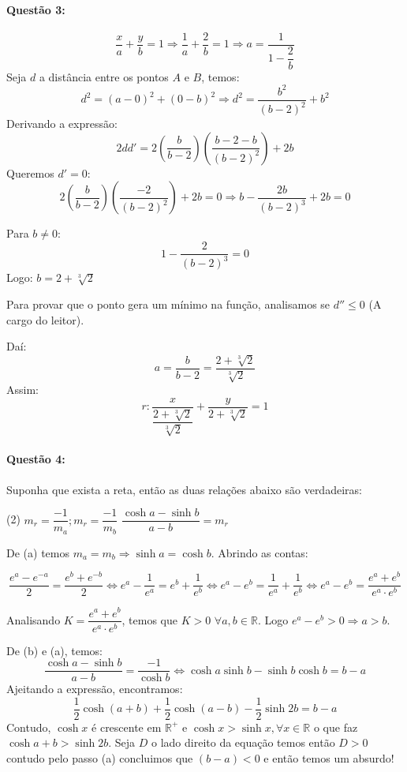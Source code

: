 \documentclass[12pt,a4paper]{article}
\begin{document}
\paragraph{Questão 3:}
$$\dfrac{x}{a} + \dfrac{y}{b} = 1 \Rightarrow \dfrac{1}{a} + \dfrac{2}{b} = 1 \Rightarrow a = \dfrac{1}{1 - \dfrac{2}{b}}$$
Seja $d$ a distância entre os pontos $A$ e $B$, temos:
$$d^2 = (a-0)^2 + (0-b)^2 \Rightarrow d^2 = \dfrac{b^2}{(b-2)^2} + b^2 $$
Derivando a expressão:
$$2dd' = 2 \left(\dfrac{b}{b-2}\right)\left(\dfrac{b-2-b}{(b-2)^2}\right)  + 2b$$ 
Queremos $d' = 0$:
$$2 \left(\dfrac{b}{b-2}\right)\left(\dfrac{-2}{(b-2)^2}\right)  + 2b = 0 \Rightarrow b - \dfrac{2b}{(b-2)^3} + 2b = 0$$

Para $b \neq 0:$ $$1 - \dfrac{2}{(b-2)^3} = 0$$
Logo: $b = 2 + \sqrt[3]{2}$

Para provar que o ponto gera um mínimo na função, analisamos se $d'' \leq 0 $ (A cargo do leitor).

Daí: $$a = \dfrac{b}{b-2} = \dfrac{2 + \sqrt[3]{2}}{\sqrt[3]{2}}$$
Assim: $$r: \dfrac{x}{\dfrac{2 + \sqrt[3]{2}}{\sqrt[3]{2}}} + \dfrac{y}{2 + \sqrt[3]{2}} = 1$$

\paragraph{Questão 4:}
Suponha que exista a reta, então as duas relações abaixo são verdadeiras:
\begin{tasks}(2)
    \task $m_r = \dfrac{-1}{m_a}; m_r = \dfrac{-1}{m_b}$
    \task $\dfrac{\cosh{a} - \sinh{b}}{a-b} = m_r$    
\end{tasks}

De (a) temos $m_a = m_b \Rightarrow \sinh{a} = \cosh{b}$. Abrindo as contas:

$$\dfrac{e^a - e^{-a}}{2} = \dfrac{e^b + e^{-b}}{2} \Leftrightarrow e^a - \dfrac{1}{e^a} = e^b + \dfrac{1}{e^b} \Leftrightarrow e^a - e^b = \dfrac{1}{e^a} + \dfrac{1}{e^b} \Leftrightarrow e^a - e^b = \dfrac{e^a + e^b}{e^a \cdot e^b} $$

Analisando $K = \dfrac{e^a + e^b}{e^a \cdot e^b} $, temos que $K > 0$  $\forall a,b \in \mathbb{R}.$
Logo $e^a - e^b > 0 \Rightarrow a > b .$

De (b) e (a), temos:$$\dfrac{\cosh{a} - \sinh{b}}{a-b} = \dfrac{-1}{\cosh{b}} \Leftrightarrow \cosh{a}\sinh{b} - \sinh{b}\cosh{b} = b - a $$
Ajeitando a expressão, encontramos: $$\dfrac{1}{2}\cosh{(a+b)} + \dfrac{1}{2}\cosh{(a-b)} - \dfrac{1}{2} \sinh{2b} = b-a$$
Contudo, $\cosh{x}$ é crescente em $\mathbb{R}^+$ e $\cosh{x} > \sinh{x}, \forall x \in \mathbb{R}$ o que faz $\cosh{a+b} > \sinh{2b}.$ Seja $D$ o lado direito da equação temos então $D>0$ contudo pelo passo (a) concluimos que $(b-a)<0$  e então temos um absurdo!
\end{document}
